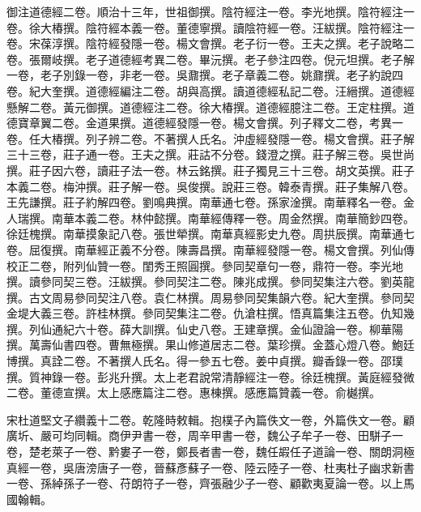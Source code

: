 \begin{pinyinscope}
御注道德經二卷。順治十三年，世祖御撰。陰符經注一卷。李光地撰。陰符經注一卷。徐大椿撰。陰符經本義一卷。董德寧撰。讀陰符經一卷。汪紱撰。陰符經注一卷。宋葆淳撰。陰符經發隱一卷。楊文會撰。老子衍一卷。王夫之撰。老子說略二卷。張爾岐撰。老子道德經考異二卷。畢沅撰。老子參注四卷。倪元坦撰。老子解一卷，老子別錄一卷，非老一卷。吳鼐撰。老子章義二卷。姚鼐撰。老子約說四卷。紀大奎撰。道德經編注二卷。胡與高撰。讀道德經私記二卷。汪縉撰。道德經懸解二卷。黃元御撰。道德經注二卷。徐大椿撰。道德經臆注二卷。王定柱撰。道德寶章翼二卷。金道果撰。道德經發隱一卷。楊文會撰。列子釋文二卷，考異一卷。任大椿撰。列子辨二卷。不著撰人氏名。沖虛經發隱一卷。楊文會撰。莊子解三十三卷，莊子通一卷。王夫之撰。莊詁不分卷。錢澄之撰。莊子解三卷。吳世尚撰。莊子因六卷，讀莊子法一卷。林云銘撰。莊子獨見三十三卷。胡文英撰。莊子本義二卷。梅沖撰。莊子解一卷。吳俊撰。說莊三卷。韓泰青撰。莊子集解八卷。王先謙撰。莊子約解四卷。劉鳴典撰。南華通七卷。孫家淦撰。南華釋名一卷。金人瑞撰。南華本義二卷。林仲懿撰。南華經傳釋一卷。周金然撰。南華簡鈔四卷。徐廷槐撰。南華摸象記八卷。張世犖撰。南華真經影史九卷。周拱辰撰。南華通七卷。屈復撰。南華經正義不分卷。陳壽昌撰。南華經發隱一卷。楊文會撰。列仙傳校正二卷，附列仙贊一卷。閨秀王照圓撰。參同契章句一卷，鼎符一卷。李光地撰。讀參同契三卷。汪紱撰。參同契注二卷。陳兆成撰。參同契集注六卷。劉英龍撰。古文周易參同契注八卷。袁仁林撰。周易參同契集韻六卷。紀大奎撰。參同契金堤大義三卷。許桂林撰。參同契集注二卷。仇滄柱撰。悟真篇集注五卷。仇知幾撰。列仙通紀六十卷。薛大訓撰。仙史八卷。王建章撰。金仙證論一卷。柳華陽撰。萬壽仙書四卷。曹無極撰。果山修道居志二卷。葉珍撰。金蓋心燈八卷。鮑廷博撰。真詮二卷。不著撰人氏名。得一參五七卷。姜中貞撰。瓣香錄一卷。邵璞撰。質神錄一卷。彭兆升撰。太上老君說常清靜經注一卷。徐廷槐撰。黃庭經發微二卷。董德宣撰。太上感應篇注二卷。惠棟撰。感應篇贊義一卷。俞樾撰。

宋杜道堅文子纘義十二卷。乾隆時敕輯。抱樸子內篇佚文一卷，外篇佚文一卷。顧廣圻、嚴可均同輯。商伊尹書一卷，周辛甲書一卷，魏公子牟子一卷、田駢子一卷，楚老萊子一卷、黔婁子一卷，鄭長者書一卷，魏任嘏任子道論一卷、關朗洞極真經一卷，吳唐滂唐子一卷，晉蘇彥蘇子一卷、陸云陸子一卷、杜夷杜子幽求新書一卷、孫綽孫子一卷、苻朗符子一卷，齊張融少子一卷、顧歡夷夏論一卷。以上馬國翰輯。


\end{pinyinscope}